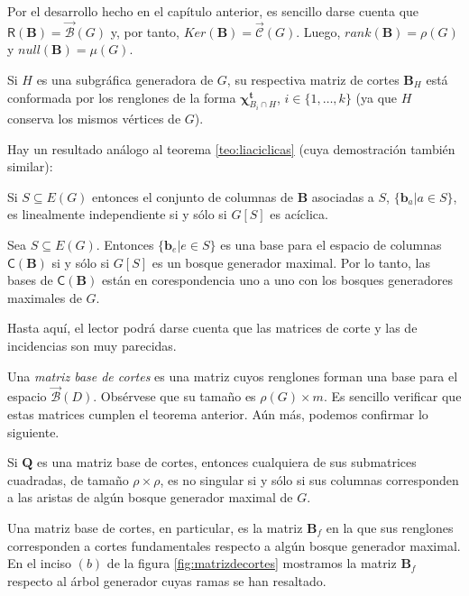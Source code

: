  Por el desarrollo hecho en el capítulo anterior, es sencillo darse cuenta que $\mathsf{R}(\mathbf{B}) =\overrightarrow{\mathcal{B}}(G)$ y, por tanto, $Ker(\mathbf{B}) = \overrightarrow{\mathcal{C}}(G)$. Luego, $rank(\mathbf{B}) = \rho(G)$ y $null(\mathbf{B}) = \mu(G)$.
 
Si $H$ es una subgráfica generadora de $G$, su respectiva matriz de cortes $\mathbf{B}_{H}$ está conformada por los renglones de la forma $\boldsymbol{\chi}_{B_{i} \cap H}^{\mathbf{t}}$, $i\in\{1, \ldots, k\}$ (ya que $H$ conserva los mismos vértices de $G$). 

Hay un resultado análogo al teorema \ref{teo:liaciclicas} (cuya demostración también similar):
\begin{teo}\label{teo:limatrizcortes}
Si $S\subseteq E(G)$ entonces el conjunto de columnas de $\mathbf{B}$ asociadas a $S$, $\{\mathbf{b}_{a}| a \in S\}$, es linealmente independiente si y sólo si $G[S]$ es acíclica.
\end{teo}

\begin{cor} Sea
$S \subseteq E(G)$. Entonces $\{\mathbf{b}_{e} | e \in S\}$ es una base para el espacio de columnas $\mathsf{C}(\mathbf{B})$ si y sólo si $G[S]$ es un bosque generador maximal. Por lo tanto, las bases de $\mathsf{C}(\mathbf{B})$ están en corespondencia uno a uno con los bosques generadores maximales de $G$.
\end{cor} 

Hasta aquí, el lector podrá darse cuenta que las matrices de corte y las de incidencias son muy parecidas.

Una \textit{matriz base de cortes} es una matriz cuyos renglones forman una base para el espacio $\overrightarrow{\mathcal{B}}(D)$. Obsérvese que su tamaño es $\rho(G) \times m$. Es sencillo verificar que estas matrices cumplen el teorema anterior. Aún más, podemos confirmar lo siguiente.

\begin{teo} \label{teo:submatricesmatridecortes}
Si $\mathbf{Q}$ es una matriz base de cortes, entonces cualquiera de sus submatrices cuadradas, de tamaño $\rho \times \rho$, es no singular si y sólo si sus columnas corresponden a las aristas de algún bosque generador maximal de $G$.
\end{teo}

Una matriz base de cortes, en particular, es la matriz $\mathbf{B}_{f}$ en la que sus renglones corresponden a cortes fundamentales respecto a algún bosque generador maximal. En el inciso $(b)$ de la figura \ref{fig:matrizdecortes} mostramos la matriz $\mathbf{B}_{f}$ respecto al árbol generador cuyas ramas se han resaltado.


